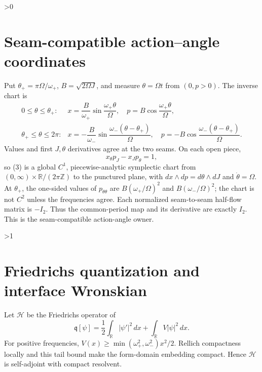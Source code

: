 \documentclass[10pt]{article}
\providecommand{\CRevisionRound}{2}
\newcommand{\R}{\mathbb{R}}
\begin{document}
\ifnum\CRevisionRound>0
\section{Seam-compatible action--angle coordinates}
Put \(\theta_+=\pi\Omega/\omega_+\), \(B=\sqrt{2\Omega J}\), and measure
\(\theta=\Omega t\) from \((0,p>0)\). The inverse chart is
\[
\begin{array}{ll}
0\leq\theta\leq\theta_+:&
x=\dfrac B{\omega_+}\sin\dfrac{\omega_+\theta}{\Omega},\quad
p=B\cos\dfrac{\omega_+\theta}{\Omega},\\[6pt]
\theta_+\leq\theta\leq2\pi:&
x=-\dfrac B{\omega_-}\sin\dfrac{\omega_-(\theta-\theta_+)}{\Omega},\quad
p=-B\cos\dfrac{\omega_-(\theta-\theta_+)}{\Omega}.
\end{array}                                                    \tag{3}
\]
Values and first \(J,\theta\) derivatives agree at the two seams. On each
open piece,
\[
 x_\theta p_J-x_Jp_\theta=1,
\]
so (3) is a global \(C^1\), piecewise-analytic symplectic chart from
\((0,\infty)\times\R/(2\pi\mathbb Z)\) to the punctured plane, with
\(dx\wedge dp=d\theta\wedge dJ\) and \(\dot\theta=\Omega\).
At \(\theta_+\), the one-sided values of \(p_{\theta\theta}\) are
\(B(\omega_+/\Omega)^2\) and \(B(\omega_-/\Omega)^2\); the chart is not
\(C^2\) unless the frequencies agree. Each normalized seam-to-seam half-flow
matrix is \(-I_2\). Thus the common-period map and its derivative are exactly
\(I_2\). This is the seam-compatible action-angle owner.
\fi

\ifnum\CRevisionRound>1
\section{Friedrichs quantization and interface Wronskian}
Let \(\mathcal H\) be the Friedrichs operator of
\[
 \mathfrak q[\psi]=\frac12\int_{\R}|\psi'|^2\,dx+\int_{\R} V|\psi|^2\,dx.
\]
For positive frequencies,
\(V(x)\geq\min(\omega_+^2,\omega_-^2)x^2/2\). Rellich compactness locally
and this tail bound make the form-domain embedding compact. Hence
\(\mathcal H\) is self-adjoint with compact resolvent.
\end{document}

